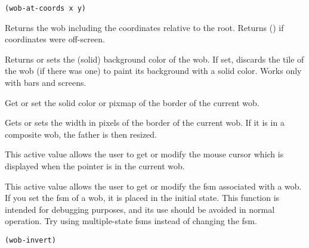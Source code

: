 
{\usagefont\begin{verbatim}
(wob-at-coords x y)
\end{verbatim}}\usageupspace

Returns the wob including the coordinates relative to the root. Returns () if
coordinates were off-screen.

        

Returns or sets the (solid) background color of the wob. If set, discards the
tile of the wob (if there was one) to paint its background with a solid color.
Works only with bars and screens.

        

Get or set the solid color or pixmap of the border of the current wob.

        

Gets or sets the width in pixels of the border of the current wob.  If it is in
a composite wob, the father is then resized.



This active value allows the user to get or modify the mouse cursor which
is displayed when the pointer is in the current wob.

        

This active value allows the user to get or  modify the fsm associated with
a wob.  If you set the fsm of a wob, it is placed in the initial state.
This function is intended for debugging purposes, and its use should be
avoided in normal operation. Try using multiple-state fsms instead of
changing the fsm.

        
{\usagefont\begin{verbatim}
(wob-invert)
\end{verbatim}}\usageupspace

